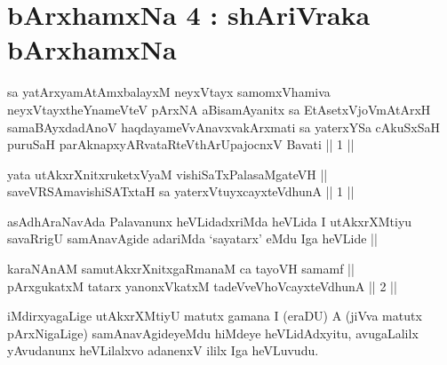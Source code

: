 

\chapter{bArxhamxNa 4 : shAriVraka bArxhamxNa}


\begin{shl}
sa yatArxyamAtAmxbalayxM neyxVtayx samomxVhamiva neyxVtayxtheYnameVteV pArxNA aBisamAyanitx sa EtAsetxVjoVmAtArxH samaBAyxdadAnoV haqdayameVvAnavxvakArxmati sa yaterxYSa cAkuSxSaH puruSaH parAknapxyARvataRteV\s thArUpajocnxV Bavati || 1 ||
\end{shl}



\begin{shl}
yata utAkxrXnitxruketxVyaM vishiSaTxPalasaMgateVH || \\
saveVRSAmavishiSATx\s taH sa yaterxVtuyxcayxteV\s dhunA \hfill || 1 ||
  
\end{shl}

\begin{artha}
asAdhAraNavAda Palavanunx heVLidadxriMda heVLida I utAkxrXMtiyu
savaRrigU samAnavAgide adariMda `sayatarx' eMdu Iga heVLide ||
\end{artha}


\begin{shl}
karaNAnAM samutAkxrXnitxgaRmanaM ca tayoVH samamf || \\
pArxgukatxM tatarx yanonxVkatxM tadeVveVhoVcayxteV\s dhunA \hfill || 2 ||
  
\end{shl}

\begin{artha}
iMdirxyagaLige utAkxrXMtiyU matutx gamana I (eraDU) A (jiVva matutx
pArxNigaLige) samAnavAgideyeMdu hiMdeye heVLidAdxyitu, avugaLalilx
yAvudanunx heVLilalxvo adanenxV ililx Iga heVLuvudu.
\end{artha}

